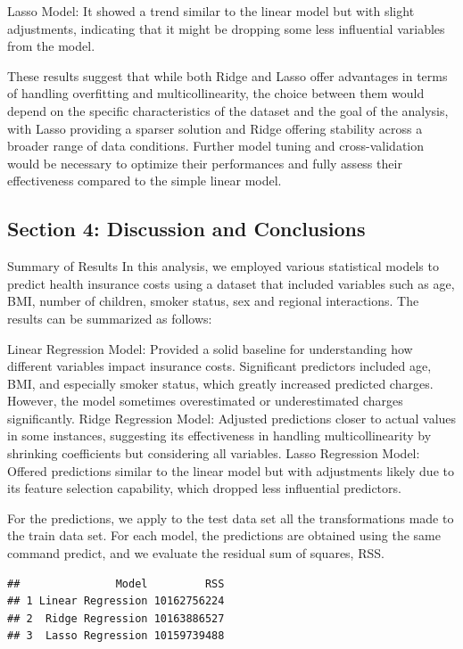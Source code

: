 \documentclass[
  12pt,
]{article}
\begin{document}
Lasso Model: It showed a trend similar to the linear model but with
slight adjustments, indicating that it might be dropping some less
influential variables from the model.

These results suggest that while both Ridge and Lasso offer advantages
in terms of handling overfitting and multicollinearity, the choice
between them would depend on the specific characteristics of the dataset
and the goal of the analysis, with Lasso providing a sparser solution
and Ridge offering stability across a broader range of data conditions.
Further model tuning and cross-validation would be necessary to optimize
their performances and fully assess their effectiveness compared to the
simple linear model.

\newpage

\subsection{Section 4: Discussion and
Conclusions}\label{section-4-discussion-and-conclusions}

Summary of Results In this analysis, we employed various statistical
models to predict health insurance costs using a dataset that included
variables such as age, BMI, number of children, smoker status, sex and
regional interactions. The results can be summarized as follows:

Linear Regression Model: Provided a solid baseline for understanding how
different variables impact insurance costs. Significant predictors
included age, BMI, and especially smoker status, which greatly increased
predicted charges. However, the model sometimes overestimated or
underestimated charges significantly. Ridge Regression Model: Adjusted
predictions closer to actual values in some instances, suggesting its
effectiveness in handling multicollinearity by shrinking coefficients
but considering all variables. Lasso Regression Model: Offered
predictions similar to the linear model but with adjustments likely due
to its feature selection capability, which dropped less influential
predictors.

For the predictions, we apply to the test data set all the
transformations made to the train data set. For each model, the
predictions are obtained using the same command predict, and we evaluate
the residual sum of squares, RSS.

\begin{verbatim}
##               Model         RSS
## 1 Linear Regression 10162756224
## 2  Ridge Regression 10163886527
## 3  Lasso Regression 10159739488
\end{verbatim}
\end{document}
